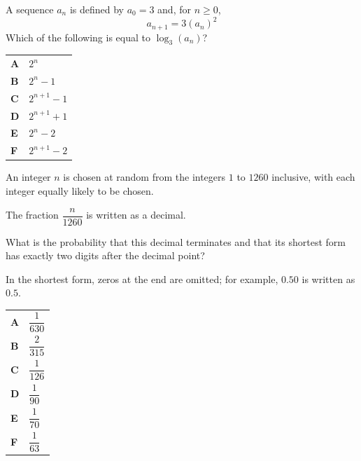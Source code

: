 \documentclass[11pt,a4paper]{article}
\begin{document}
\clearpage
\thispagestyle{djspaper}
\vspace*{8pt}
\begin{enumerate}[label=\textbf{\arabic*.},leftmargin=*,itemsep=0pt,start=10]
A sequence $a_n$ is defined by $a_0=3$ and, for $n\ge 0$, \[ a_{n+1}=3(a_n)^2 \] Which of the following is equal to $\log_3(a_n)$?

\par\vspace*{12pt}
\begin{tabularx}{\linewidth}{@{}>{\bfseries}l Y@{}}
A &
$2^n$
\\[0.8em]
B &
$2^n-1$
\\[0.8em]
C &
$2^{n+1}-1$
\\[0.8em]
D &
$2^{n+1}+1$
\\[0.8em]
E &
$2^{n}-2$
\\[0.8em]
F &
$2^{n+1}-2$
\\
\end{tabularx}
\end{enumerate}
\clearpage
\thispagestyle{djspaper}
\vspace*{8pt}
\begin{enumerate}[label=\textbf{\arabic*.},leftmargin=*,itemsep=0pt,start=11]
\questionitem[Number]
An integer $n$ is chosen at random from the integers $1$ to $1260$ inclusive, with each integer equally likely to be chosen. 

The fraction $\dfrac{n}{1260}$ is written as a decimal.

What is the probability that this decimal terminates and that its shortest form has exactly two digits after the decimal point?

In the shortest form, zeros at the end are omitted; for example, $0.50$ is written as $0.5$.

\par\vspace*{12pt}
\begin{tabularx}{\linewidth}{@{}>{\bfseries}l Y@{}}
A &
$\dfrac{1}{630}$
\\[0.8em]
B &
$\dfrac{2}{315}$
\\[0.8em]
C &
$\dfrac{1}{126}$
\\[0.8em]
D &
$\dfrac{1}{90}$
\\[0.8em]
E &
$\dfrac{1}{70}$
\\[0.8em]
F &
$\dfrac{1}{63}$
\\
\end{tabularx}
\end{enumerate}
\end{document}
